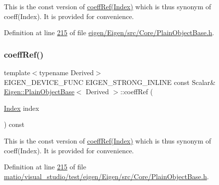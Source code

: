 This is the const version of \hyperlink{class_eigen_1_1_plain_object_base_a571632ed666076d7403c8bd3eece44f0}{coeff\+Ref(\+Index)} which is thus synonym of coeff(\+Index). It is provided for convenience. 

Definition at line \hyperlink{eigen_2_eigen_2src_2_core_2_plain_object_base_8h_source_l00215}{215} of file \hyperlink{eigen_2_eigen_2src_2_core_2_plain_object_base_8h_source}{eigen/\+Eigen/src/\+Core/\+Plain\+Object\+Base.\+h}.

\mbox{\label{class_eigen_1_1_plain_object_base_a982b56223d011e2f836a3408983883d4}} 
\subsubsection{\texorpdfstring{coeff\+Ref()}{coeffRef()}\hspace{0.1cm}{\footnotesize\ttfamily [8/8]}}
{\footnotesize\ttfamily template$<$typename Derived$>$ \\
E\+I\+G\+E\+N\+\_\+\+D\+E\+V\+I\+C\+E\+\_\+\+F\+U\+NC E\+I\+G\+E\+N\+\_\+\+S\+T\+R\+O\+N\+G\+\_\+\+I\+N\+L\+I\+NE const Scalar\& \hyperlink{class_eigen_1_1_plain_object_base}{Eigen\+::\+Plain\+Object\+Base}$<$ Derived $>$\+::coeff\+Ref (\begin{DoxyParamCaption}\item[{\hyperlink{namespace_eigen_a62e77e0933482dafde8fe197d9a2cfde}{Index}}]{index }\end{DoxyParamCaption}) const\hspace{0.3cm}{\ttfamily [inline]}}

This is the const version of \hyperlink{class_eigen_1_1_plain_object_base_a571632ed666076d7403c8bd3eece44f0}{coeff\+Ref(\+Index)} which is thus synonym of coeff(\+Index). It is provided for convenience. 

Definition at line \hyperlink{matio_2visual__studio_2test_2eigen_2_eigen_2src_2_core_2_plain_object_base_8h_source_l00215}{215} of file \hyperlink{matio_2visual__studio_2test_2eigen_2_eigen_2src_2_core_2_plain_object_base_8h_source}{matio/visual\+\_\+studio/test/eigen/\+Eigen/src/\+Core/\+Plain\+Object\+Base.\+h}.

\mbox{\label{class_eigen_1_1_plain_object_base_a5e06c62950ba98fe8ba9c7d4be9c19e4}} 
